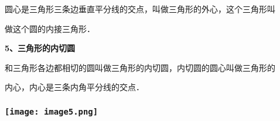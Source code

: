 圆心是三角形三条边垂直平分线的交点，叫做三角形的外心，这个三角形叫

做这个圆的内接三角形．

\textbf{5、三角形的内切圆}

和三角形各边都相切的圆叫做三角形的内切圆，内切圆的圆心叫做三角形的

内心，内心是三条内角平分线的交点．

\hypertarget{ux5b66ux79d1ux7f51www.zxxk.com--ux6559ux80b2ux8d44ux6e90ux95e8ux6237ux63d0ux4f9bux8bd5ux9898ux8bd5ux5377ux6559ux6848ux8bfeux4ef6ux6559ux5b66ux8bbaux6587ux7d20ux6750ux7b49ux5404ux7c7bux6559ux5b66ux8d44ux6e90ux5e93ux4e0bux8f7dux8fd8ux6709ux5927ux91cfux4e30ux5bccux7684ux6559ux5b66ux8d44ux8baf-20}{%
\subsubsection{\texorpdfstring{\protect\texttt{[image: image5.png]}}{学科网(www.zxxk.com)-\/-教育资源门户，提供试题试卷、教案、课件、教学论文、素材等各类教学资源库下载，还有大量丰富的教学资讯！}}\label{ux5b66ux79d1ux7f51www.zxxk.com--ux6559ux80b2ux8d44ux6e90ux95e8ux6237ux63d0ux4f9bux8bd5ux9898ux8bd5ux5377ux6559ux6848ux8bfeux4ef6ux6559ux5b66ux8bbaux6587ux7d20ux6750ux7b49ux5404ux7c7bux6559ux5b66ux8d44ux6e90ux5e93ux4e0bux8f7dux8fd8ux6709ux5927ux91cfux4e30ux5bccux7684ux6559ux5b66ux8d44ux8baf-20}}

